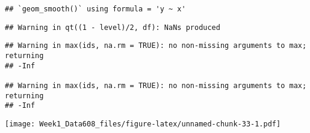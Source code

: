 \documentclass[
]{article}
\begin{document}
\begin{verbatim}
## `geom_smooth()` using formula = 'y ~ x'
\end{verbatim}

\begin{verbatim}
## Warning in qt((1 - level)/2, df): NaNs produced
\end{verbatim}

\begin{verbatim}
## Warning in max(ids, na.rm = TRUE): no non-missing arguments to max; returning
## -Inf

## Warning in max(ids, na.rm = TRUE): no non-missing arguments to max; returning
## -Inf
\end{verbatim}

\texttt{[image: Week1\_Data608\_files/figure-latex/unnamed-chunk-33-1.pdf]}
\end{document}
